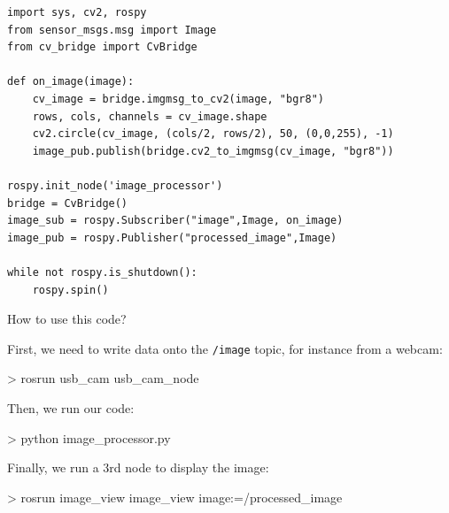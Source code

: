 \documentclass[compress]{beamer}
\begin{document}
\begin{frame}[containsverbatim]{}

\begin{verbatim}
import sys, cv2, rospy
from sensor_msgs.msg import Image
from cv_bridge import CvBridge

def on_image(image):
    cv_image = bridge.imgmsg_to_cv2(image, "bgr8")
    rows, cols, channels = cv_image.shape
    cv2.circle(cv_image, (cols/2, rows/2), 50, (0,0,255), -1)
    image_pub.publish(bridge.cv2_to_imgmsg(cv_image, "bgr8"))

rospy.init_node('image_processor')
bridge = CvBridge()
image_sub = rospy.Subscriber("image",Image, on_image)
image_pub = rospy.Publisher("processed_image",Image)

while not rospy.is_shutdown():
    rospy.spin()
\end{verbatim}

\end{frame}

\begin{frame}[fragile]{How to use this code?}

First, we need to write data onto the \texttt{/image} topic, for instance from a
webcam:

\begin{shcode}
> rosrun usb_cam usb_cam_node
\end{shcode}

\pause

Then, we run our code:

\begin{shcode}
> python image_processor.py
\end{shcode}

\pause

Finally, we run a 3rd node to display the image:

\begin{shcode}
> rosrun image_view image_view image:=/processed_image
\end{shcode}

\end{frame}




\end{document}
